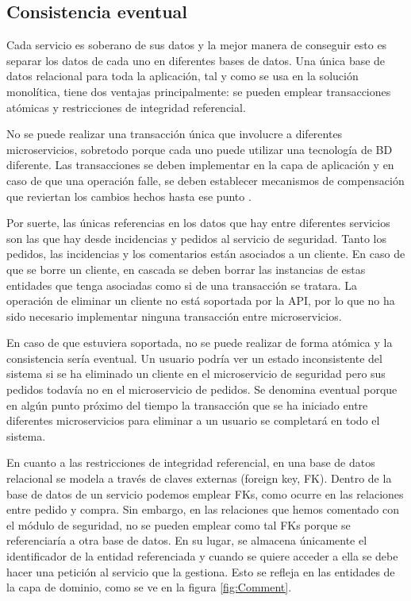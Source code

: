 \documentclass[11pt,spanish,listoffigures]{tfgetsinf}
\begin{document}
\subsection{Consistencia eventual}

Cada servicio es soberano de sus datos y la mejor manera de conseguir esto es separar los datos de cada uno en diferentes bases de datos. Una única base de datos relacional para toda la aplicación, tal y como se usa en la solución monolítica, tiene dos ventajas principalmente: se pueden emplear transacciones atómicas y restricciones de integridad referencial. 

No se puede realizar una transacción única que involucre a diferentes microservicios, sobretodo porque cada uno puede utilizar una tecnología de BD diferente. Las transacciones se deben implementar en la capa de aplicación y en caso de que una operación falle, se deben establecer mecanismos de compensación que reviertan los cambios hechos hasta ese punto \cite{DelaTorre2018}.

Por suerte, las únicas referencias en los datos que hay entre diferentes servicios son las que hay desde incidencias y pedidos al servicio de seguridad. Tanto los pedidos, las incidencias y los comentarios están asociados a un cliente. En caso de que se borre un cliente, en cascada se deben borrar las instancias de estas entidades que tenga asociadas como si de una transacción se tratara. La operación de eliminar un cliente no está soportada por la API, por lo que no ha sido necesario implementar ninguna transacción entre microservicios.

En caso de que estuviera soportada, no se puede realizar de forma atómica y la consistencia sería eventual. Un usuario podría ver un estado inconsistente del sistema si se ha eliminado un cliente en el microservicio de seguridad pero sus pedidos todavía no en el microservicio de pedidos. Se denomina eventual porque en algún punto próximo del tiempo la transacción que se ha iniciado entre diferentes microservicios para eliminar a un usuario se completará en todo el sistema.

En cuanto a las restricciones de integridad referencial, en una base de datos relacional se modela a través de claves externas (foreign key, FK). Dentro de la base de datos de un servicio podemos emplear FKs, como ocurre en las relaciones entre pedido y compra. Sin embargo, en las relaciones que hemos comentado con el módulo de seguridad, no se pueden emplear como tal FKs porque se referenciaría a otra base de datos. En su lugar, se almacena únicamente el identificador de la entidad referenciada y cuando se quiere acceder a ella se debe hacer una petición al servicio que la gestiona. Esto se refleja en las entidades de la capa de dominio, como se ve en la figura \ref{fig:Comment}.
\end{document}
